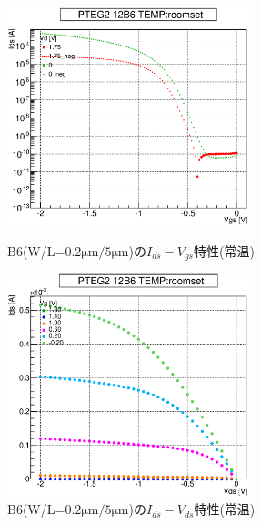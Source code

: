 				\begin{figure}[htbp]
					\begin{minipage}{0.5\hsize}
						\begin{center}
							\includegraphics[width=70mm]{./Chapter/Appendix/Picture/PBT/B6/PTEG2_12_B6_IdVg_roomset.eps}
						\end{center}
						\caption{B6(W/L=$0.2\mathrm{\mu m}/5\mathrm{\mu m}$)の$I_{ds}-V_{gs}$特性(常温)}
						\label{fig:B6_IdVg_room}
					\end{minipage}
					\begin{minipage}{0.5\hsize}
						\begin{center}
							\includegraphics[width=70mm]{./Chapter/Appendix/Picture/PBT/B6/PTEG2_12_B6_IdVd_roomset.eps}
						\end{center}
						\caption{B6(W/L=$0.2\mathrm{\mu m}/5\mathrm{\mu m}$)の$I_{ds}-V_{ds}$特性(常温)}
						\label{fig:B6_IdVd_room}
					\end{minipage}
				\end{figure}
